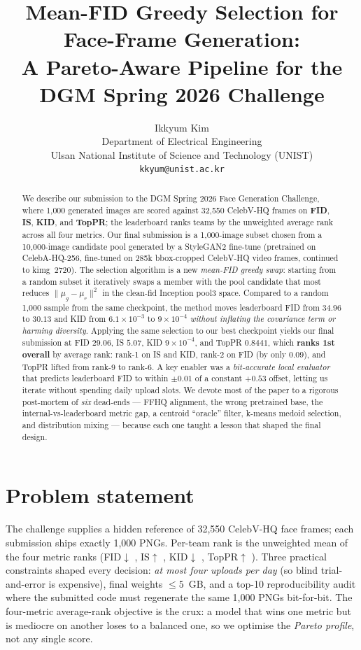 \documentclass{article}
\title{Mean-FID Greedy Selection for Face-Frame Generation:\\
A Pareto-Aware Pipeline for the DGM Spring 2026 Challenge}
\author{Ikkyum Kim \\
Department of Electrical Engineering\\
Ulsan National Institute of Science and Technology (UNIST)\\
\texttt{kkyum@unist.ac.kr} \\
}
\begin{document}
\maketitle

\begin{abstract}
We describe our submission to the DGM Spring 2026 Face Generation Challenge,
where 1,000 generated images are scored against 32,550 CelebV-HQ frames on
\textbf{FID}, \textbf{IS}, \textbf{KID}, and \textbf{TopPR}; the leaderboard
ranks teams by the unweighted average rank across all four metrics. Our final
submission is a 1,000-image subset chosen from a 10,000-image candidate pool
generated by a StyleGAN2 fine-tune (pretrained on CelebA-HQ-256, fine-tuned on
285k bbox-cropped CelebV-HQ video frames, continued to kimg~2720). The
selection algorithm is a new \emph{mean-FID greedy swap}: starting from a random
subset it iteratively swaps a member with the pool candidate that most reduces
$\|\mu_g-\mu_r\|^2$ in the clean-fid Inception pool3 space. Compared to a random
1,000 sample from the same checkpoint, the method moves leaderboard FID from
$34.96$ to $30.13$ and KID from $6.1\!\times\!10^{-3}$ to $9\!\times\!10^{-4}$
\emph{without inflating the covariance term or harming diversity}. Applying the
same selection to our best checkpoint yields our final submission at FID
$29.06$, IS $5.07$, KID $9\!\times\!10^{-4}$, and TopPR $0.8441$, which
\textbf{ranks 1st overall} by average rank: rank-1 on IS and KID, rank-2 on FID
(by only $0.09$), and TopPR lifted from rank-9 to rank-6. A key enabler was a
\emph{bit-accurate local evaluator} that predicts leaderboard FID to within
$\pm0.01$ of a constant $+0.53$ offset, letting us iterate without spending
daily upload slots. We devote most of the paper to a rigorous post-mortem of
\emph{six} dead-ends --- FFHQ alignment, the wrong pretrained base, the
internal-vs-leaderboard metric gap, a centroid ``oracle'' filter, k-means
medoid selection, and distribution mixing --- because each one taught a
lesson that shaped the final design.
\end{abstract}

\section{Problem statement}
The challenge supplies a hidden reference of 32,550 CelebV-HQ
\citep{zhu2022celebv} face frames; each submission ships exactly 1,000 PNGs.
Per-team rank is the unweighted mean of the four metric ranks
(FID$\downarrow$ \citep{heusel2017gans}, IS$\uparrow$ \citep{salimans2016improved},
KID$\downarrow$ \citep{binkowski2018demystifying},
TopPR$\uparrow$ \citep{kim2023toppr}). Three practical
constraints shaped every decision: \emph{at most four uploads per day} (so blind
trial-and-error is expensive), final weights $\leq 5$~GB, and a top-10
reproducibility audit where the submitted code must regenerate the same 1,000
PNGs bit-for-bit. The four-metric average-rank objective is the crux: a model
that wins one metric but is mediocre on another loses to a balanced one, so we
optimise the \emph{Pareto profile}, not any single score.
\end{document}
